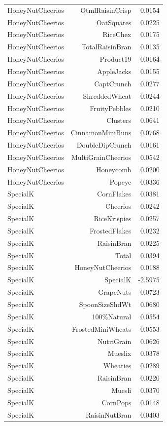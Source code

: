 \begin{longtable}{@{}lrr@{}}
HoneyNutCheerios & OtmlRaisinCrisp & 0.0154 \\
HoneyNutCheerios & OatSquares & 0.0225 \\
HoneyNutCheerios & RiceChex & 0.0175 \\
HoneyNutCheerios & TotalRaisinBran & 0.0135 \\
HoneyNutCheerios & Product19 & 0.0164 \\
HoneyNutCheerios & AppleJacks & 0.0155 \\
HoneyNutCheerios & CaptCrunch & 0.0277 \\
HoneyNutCheerios & ShreddedWheat & 0.0244 \\
HoneyNutCheerios & FruityPebbles & 0.0210 \\
HoneyNutCheerios & Clusters & 0.0641 \\
HoneyNutCheerios & CinnamonMiniBuns & 0.0768 \\
HoneyNutCheerios & DoubleDipCrunch & 0.0161 \\
HoneyNutCheerios & MultiGrainCheerios & 0.0542 \\
HoneyNutCheerios & Honeycomb & 0.0200 \\
HoneyNutCheerios & Popeye & 0.0336 \\
SpecialK & CornFlakes & 0.0381 \\
SpecialK & Cheerios & 0.0242 \\
SpecialK & RiceKrispies & 0.0257 \\
SpecialK & FrostedFlakes & 0.0232 \\
SpecialK & RaisinBran & 0.0225 \\
SpecialK & Total & 0.0394 \\
SpecialK & HoneyNutCheerios & 0.0188 \\
SpecialK & SpecialK & -2.5975 \\
SpecialK & GrapeNuts & 0.0723 \\
SpecialK & SpoonSizeShdWt & 0.0680 \\
SpecialK & 100\%Natural & 0.0554 \\
SpecialK & FrostedMiniWheats & 0.0553 \\
SpecialK & NutriGrain & 0.0626 \\
SpecialK & Mueslix & 0.0378 \\
SpecialK & Wheaties & 0.0289 \\
SpecialK & RaisinBran & 0.0220 \\
SpecialK & Muesli & 0.0370 \\
SpecialK & CornPops & 0.0148 \\
SpecialK & RaisinNutBran & 0.0403 \\

\end{longtable}
